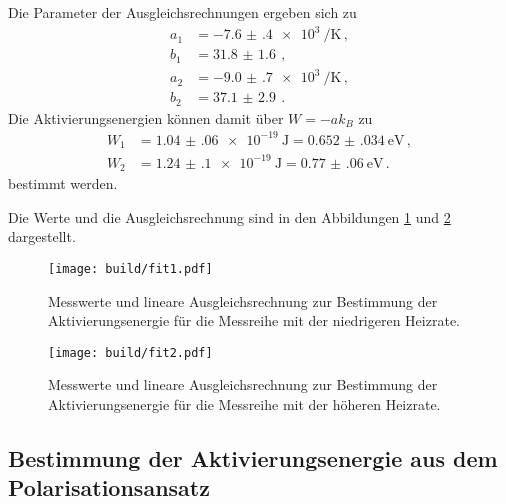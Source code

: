 Die Parameter
der Ausgleichsrechnungen ergeben sich zu
\begin{align*}
  a_1&=\SI{-7.6(4)e+3}{\per\kelvin} \,, \\
  b_1&=\SI{31.8(16)}{}  \,, \\
  a_2&=\SI{-9.0(7)e+3}{\per\kelvin} \,, \\
  b_2&=\SI{37.1(29)}{}  \,.
\end{align*}
Die Aktivierungsenergien können damit über $W=-ak_B$ zu
\begin{align*}
 W_1&=\SI{1.04(06)e-19}{\joule}= \SI{0.652(034)}{\eV}  \,, \\
 W_2&=\SI{1.24(10)e-19}{\joule}=\SI{0.77(06)}{\eV} \,.
\end{align*}
bestimmt werden.

Die Werte und die Ausgleichsrechnung sind in den Abbildungen \ref{fig:fit1} und
\ref{fig:fit2} dargestellt.

\begin{figure}
  \centering
  \texttt{[image: build/fit1.pdf]}
  \caption{Messwerte und lineare Ausgleichsrechnung zur Bestimmung der Aktivierungsenergie für
  die Messreihe mit der niedrigeren Heizrate.}
  \label{fig:fit1}
\end{figure}
\begin{figure}
  \centering
  \texttt{[image: build/fit2.pdf]}
  \caption{Messwerte und lineare Ausgleichsrechnung zur Bestimmung der Aktivierungsenergie für
  die Messreihe mit der höheren Heizrate.}
  \label{fig:fit2}
\end{figure}

\subsection{Bestimmung der Aktivierungsenergie aus dem Polarisationsansatz}
